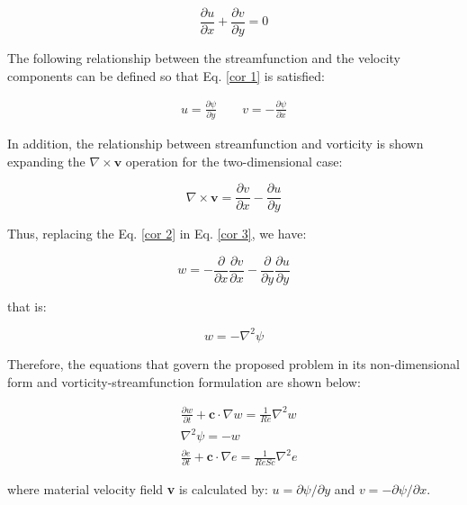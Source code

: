 \begin{equation} \label{cor 1}
 \frac{\partial u}{\partial x}
 +
 \frac{\partial v}{\partial y}
 =
 0
\end{equation}
 
\medskip
The following relationship between the streamfunction and
 the velocity components can be defined so that
 Eq. \ref{cor 1} is satisfied:


\begin{equation} \label{cor 2}
\begin{aligned}
 u = \frac{\partial \psi}{\partial y}
 \qquad
 v = - \frac{\partial \psi}{\partial x}
\end{aligned}
\end{equation}

\medskip
\noindent
In addition, the relationship between streamfunction
and vorticity is shown expanding the
$\nabla \times \textbf{v}$ operation
for the two-dimensional case:


\begin{equation} \label{cor 3}
 \nabla \times \textbf{v}
 = 
 \frac{\partial v}{\partial x}
 - 
 \frac{\partial u}{\partial y}
\end{equation}

\medskip
\noindent
Thus, replacing the 
Eq. \ref{cor 2} in Eq. \ref{cor 3},
we have:

\begin{equation}
 w
 =
 - 
 \frac{\partial}{\partial x} \frac{\partial v}{\partial x}
 -
 \frac{\partial}{\partial y} \frac{\partial u}{\partial y}
\end{equation}

\medskip
\noindent
that is:

\begin{equation}
 w
 = 
 -
 \nabla^{2} \psi
\end{equation}

\medskip
Therefore, the equations that govern the proposed problem
in its non-dimensional form and vorticity-streamfunction formulation
are shown below:

\begin{align}
& \frac{\partial w}{\partial t}
 +
 \textbf{c} \cdot \nabla w
 =
 \frac{1}{Re} \nabla^{2} w \label{vorticidade}
 \\[10pt] 
& \nabla^{2} \psi
 = 
 - 
 w \label{corrente} \\[10pt]
& \frac{\partial e}{\partial t}
 +
 \textbf{c} \cdot \nabla e
 =
 \frac{1}{ReSc} \nabla^{2} e \label{especie quimica}
\end{align}

\medskip
\noindent
where material velocity field \textbf{v} is calculated by:
$u = \partial \psi / \partial y$ and 
$v = - \partial \psi / \partial x$. 


